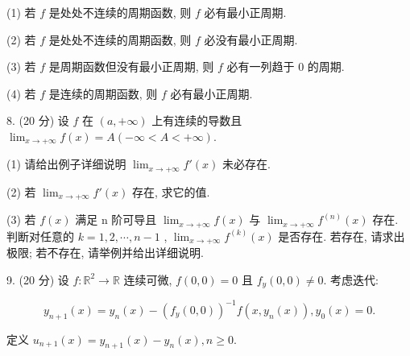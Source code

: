 \documentclass{examcollection}
\renewcommand{\displayformula}[1]{\[#1\]}
\begin{document}
{\begin{minipage}{\textwidth}
(1) 若 $f$ 是处处不连续的周期函数, 则 $f$ 必有最小正周期.\par
(2) 若 $f$ 是处处不连续的周期函数, 则 $f$ 必没有最小正周期.\par
(3) 若 $f$ 是周期函数但没有最小正周期, 则 $f$ 必有一列趋于 0 的周期.\par
(4) 若 $f$ 是连续的周期函数, 则 $f$ 必有最小正周期.\par
8. (20 分) 设 $f$ 在 $(a, +\infty)$ 上有连续的导数且 $\lim_{x \to +\infty} f(x) = A (-\infty < A < +\infty)$.\par
(1) 请给出例子详细说明 $\lim_{x \to +\infty} f'(x)$ 未必存在.\par
(2) 若 $\lim_{x\to +\infty}f'(x)$ 存在, 求它的值.\par
(3) 若  $f(x)$  满足 n 阶可导且  $\lim_{x\to+\infty}f(x)$  与  $\lim_{x\to+\infty}f^{(n)}(x)$  存在. 判断对任意的  $k=1,2,\cdots,n-1$ ,  $\lim_{x\to+\infty}f^{(k)}(x)$  是否存在. 若存在, 请求出极限; 若不存在, 请举例并给出详细说明.\par
9. (20 分) 设 $f: \mathbb{R}^2 \to \mathbb{R}$ 连续可微, $f(0,0) = 0$ 且 $f_y(0,0) \neq 0$. 考虑迭代:\par
\displayformula{y _ {n + 1} (x) = y _ {n} (x) - \left(f _ {y} (0, 0)\right) ^ {- 1} f (x, y _ {n} (x)), y _ {0} (x) = 0.}\par
定义 $u_{n + 1}(x) = y_{n + 1}(x) - y_n(x), n \geq 0.$\par
\end{minipage}}
\ifdim\dimexpr\ht\proofbox+\dp\proofbox\relax>\textheight
\noindent\resizebox{!}{\textheight}{\usebox{\proofbox}}\else\noindent\usebox{\proofbox}\fi\clearpage
\end{document}
